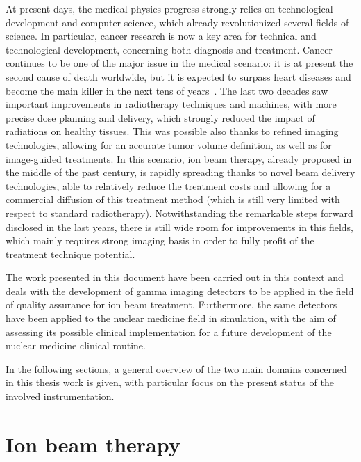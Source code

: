 At present days, the medical physics progress strongly relies on technological development and computer science, which already revolutionized several fields of science. In particular, cancer research is now a key area for technical and technological development, concerning both diagnosis and treatment\parencite{Webb2009}. Cancer continues to be one of the major issue in the medical scenario: it is at present the second cause of death worldwide, but it is expected to surpass heart diseases and become the main killer in the next tens of years~\parecite{}. The last two decades saw important improvements in radiotherapy techniques and machines, with more precise dose planning and delivery, which strongly reduced the impact of radiations on healthy tissues. This was possible also thanks to refined imaging technologies, allowing for an accurate tumor volume definition, as well as for image-guided treatments. In this scenario, ion beam therapy, already proposed in the middle of the past century, is rapidly spreading thanks to novel beam delivery technologies, able to relatively reduce the treatment costs and allowing for a commercial diffusion of this treatment method (which is still very limited with respect to standard radiotherapy). Notwithstanding the remarkable steps forward disclosed in the last years, there is still wide room for improvements in this fields, which mainly requires strong imaging basis in order to fully profit of the treatment technique potential.

The work presented in this document have been carried out in this context and deals with the development of gamma imaging detectors to be applied in the field of quality assurance for ion beam treatment. Furthermore, the same detectors have been applied to the nuclear medicine field in simulation, with the aim of assessing its possible clinical implementation for a future development of the nuclear medicine clinical routine. 

In the following sections, a general overview of the two main domains concerned in this thesis work is given, with particular focus on the present status of the involved instrumentation.       
  

\section{Ion beam therapy}\label{chap1::sec::ionBeamTher}

